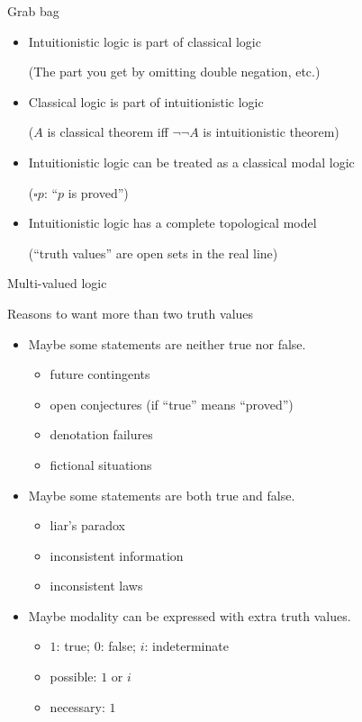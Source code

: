 \documentclass{beamer}
\newcommand{\nec}{\square}
\newcommand{\sect}[1]{\begin{frame}\centerline{\large #1}\end{frame}}
\begin{document}
\begin{frame}{Grab bag}

\begin{itemize}
\item Intuitionistic logic is part of classical logic

    (The part you get by omitting double negation, etc.)

\item Classical logic is part of intuitionistic logic

    ($A$ is classical theorem iff $\lnot\lnot A$ is intuitionistic theorem)

\item Intuitionistic logic can be treated as a classical modal logic

    ($\nec p$: ``$p$ is proved'')

\item Intuitionistic logic has a complete topological model

    (``truth values'' are open sets in the real line)
\end{itemize}
\end{frame}

\sect{Multi-valued logic}

\begin{frame}{Reasons to want more than two truth values}
\begin{itemize}
\item Maybe some statements are neither true nor false.
    \begin{itemize}
    \item future contingents
    \item open conjectures (if ``true'' means ``proved'')
    \item denotation failures
    \item fictional situations
    \end{itemize}
\item Maybe some statements are both true and false.
    \begin{itemize}
    \item liar's paradox
    \item inconsistent information
    \item inconsistent laws
    \end{itemize}
\item Maybe modality can be expressed with extra truth values.
    \begin{itemize}
    \item $1$: true; $0$: false; $i$: indeterminate
    \item possible: $1$ or $i$
    \item necessary: $1$
    \end{itemize}
\end{itemize}
\end{frame}
\end{document}

